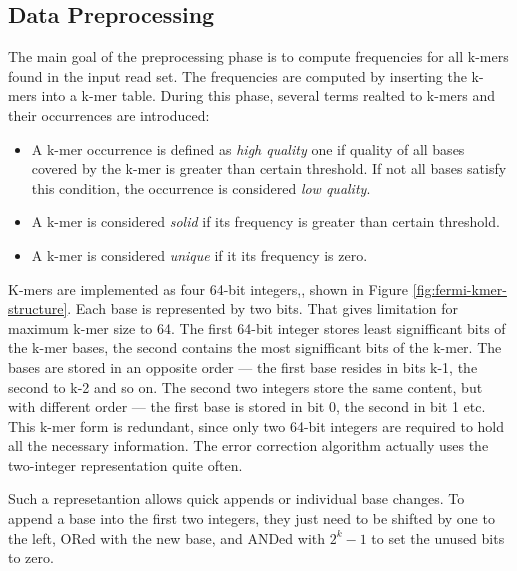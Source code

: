 \subsection{Data Preprocessing}
\label{subsec:fermi-data-preprocessing}

The main goal of the preprocessing phase is to compute frequencies for all k-mers found in the input read set. The frequencies are computed by inserting the k-mers into a k-mer table. During this phase, several terms realted to k-mers and their occurrences are introduced:
\begin{itemize}
\item A k-mer occurrence is defined as \textit{high quality} one if quality of all bases covered by the k-mer is greater than certain threshold. If not all bases satisfy this condition, the occurrence is considered \textit{low quality}.
\item A k-mer is considered \textit{solid} if its frequency is greater than certain threshold.
\item A k-mer is considered \textit{unique} if it its frequency is zero.
\end{itemize}
K-mers are implemented as four 64-bit integers,, shown in Figure \ref{fig:fermi-kmer-structure}. Each base is represented by two bits. That gives limitation for maximum k-mer size to 64. The first 64-bit integer stores least signifficant bits of the k-mer bases, the second contains the most signifficant bits of the k-mer. The bases are stored in an opposite order --- the first base resides in bits k-1, the second to k-2 and so on. The second two integers store the same content, but with different order --- the first base is stored in bit 0, the second in bit 1 etc. This k-mer form is redundant, since only two 64-bit integers are required to hold all the necessary information. The error correction algorithm actually uses the two-integer representation quite often.

Such a represetantion allows quick appends or individual base changes. To append a base into the first two integers, they just need to be shifted by one to the left, ORed with the new base, and ANDed with $2^k-1$ to set the unused bits to zero.

